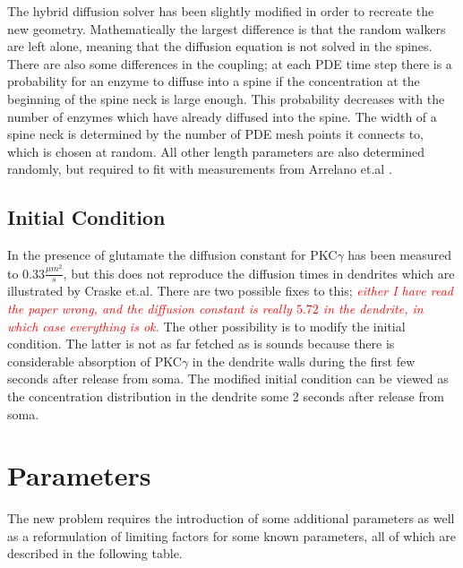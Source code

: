 The hybrid diffusion solver has been slightly modified in order to recreate the new geometry. 
Mathematically the largest difference is that the random walkers are left alone, meaning that the diffusion equation is not solved in the spines. 
There are also some differences in the coupling; at each PDE time step there is a probability for an enzyme to diffuse into a spine if the concentration at the beginning of the spine neck is large enough. This probability decreases with the number of enzymes which have already diffused into the spine. 
The width of a spine neck is determined by the number of PDE mesh points it connects to, which is chosen at random. 
All other length parameters are also determined randomly, but required to fit with measurements from Arrelano et.al \cite{arellano2007ultrastructure}. 

\subsection{Initial Condition}

In the presence of glutamate the diffusion constant for PKC$\gamma$ has been measured to $0.33\frac{\mu m^2}{s}$, but this does not reproduce the diffusion times in dendrites which are illustrated by Craske et.al. 
There are two possible fixes to this; \emph{\textcolor{red}{either I have read the paper wrong, and the diffusion constant is really $5.72$ in the dendrite, in which case everything is ok.}} 
The other possibility is to modify the initial condition. The latter is not as far fetched as is sounds because there is considerable absorption of PKC$\gamma$ in the dendrite walls during the first few seconds after release from soma. 
The modified initial condition can be viewed as the concentration distribution in the dendrite some 2 seconds after release from soma.
\clearpage

\section{Parameters}

The new problem requires the introduction of some additional parameters as well as a reformulation of limiting factors for some known parameters, all of which are described in the following table.
 
